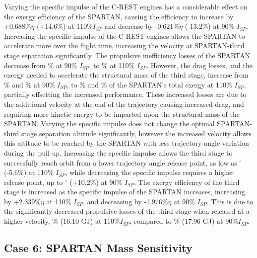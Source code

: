 Varying the specific impulse of the C-REST engines has a considerable effect on the exergy efficiency of the SPARTAN, causing the efficiency to increase by +0.688\%$\eta$ (+14.6\%) at 110\%$I_{SP}$ and decrease by -0.621\%$\eta$ (-13.2\%) at 90\% $I_{SP}$. 
Increasing the specific impulse of the C-REST engines allows the SPARTAN to accelerate more over the flight time, increasing the velocity at SPARTAN-third stage separation significantly. The propulsive inefficiency losses of the SPARTAN decrease from \PlosssecondCombinedIspNinetyNoReturn\% at 90\% $I_{SP}$, to \PlosssecondCombinedIspOneHundredTenNoReturn \% at 110\% $I_{SP}$. However, the drag losses, and the energy needed to accelerate the structural mass of the third stage, increase from \WDsecondIspNinetyNoReturn\% and \WsecondIspNinetyNoReturn\% at 90\% $I_{SP}$, to \WDsecondIspOneHundredTenNoReturn\% and \WsecondIspOneHundredTenNoReturn\% of the SPARTAN's total exergy at 110\% $I_{SP}$, partially offsetting the increased performance. These increased losses are due to the additional velocity at the end of the trajectory causing increased drag, and requiring more kinetic energy to be imparted upon the structural mass of the SPARTAN. 
 Varying the specific impulse does not change the optimal SPARTAN-third stage separation altitude significantly, however the increased velocity allows this altitude to be reached by the SPARTAN with less trajectory angle variation during the pull-up. Increasing the specific impulse allows the third stage to successfully reach orbit from a lower trajectory angle release point, as low as \secondthirdSeparationgammaIspOneHundredTenNoReturn$^\circ$ (-5.6\%) at 110\% $I_{SP}$, while decreasing the specific impulse requires a higher release point, up to \secondthirdSeparationgammaIspNinetyNoReturn$^\circ$ (+10.2\%) at 90\% $I_{SP}$.
The exergy efficiency of the third stage is increased as the specific impulse of the SPARTAN increases, increasing by +2.339\%$\eta$ at 110\% $I_{SP}$, and decreasing by -1.976\%$\eta$ at 90\% $I_{SP}$. This is due to the significantly decreased propulsive losses of the third stage when released at a higher velocity, \PlossthreeCombinedIspOneHundredTenNoReturn\% (16.10 GJ) at 110\%$I_{SP}$, compared to \PlossthreeCombinedIspNinetyNoReturn\% (17.96 GJ) at 90\%$I_{SP}$. 

\subsection{Case 6: SPARTAN Mass Sensitivity}\label{sec:SpartanMassnoreturn}


